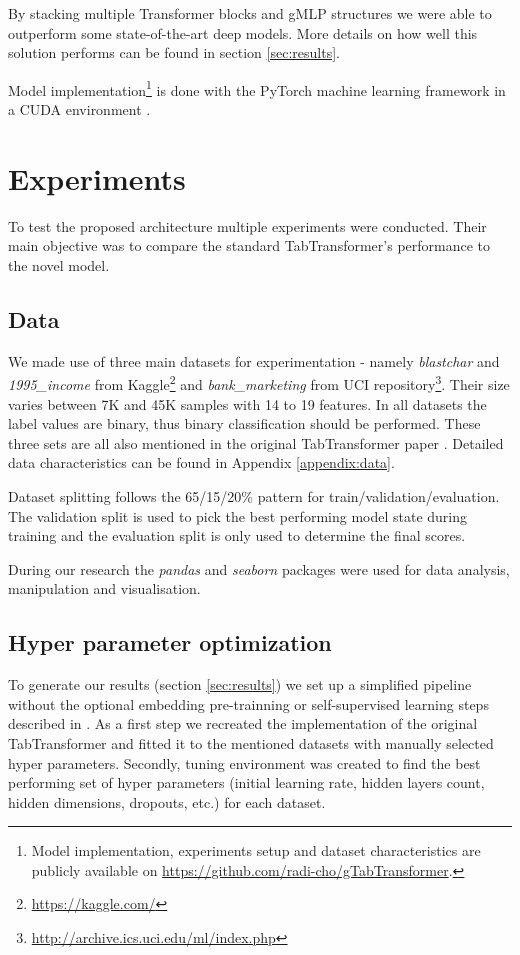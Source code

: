\documentclass{article}
\newcommand{\projectSource}{\url{https://github.com/radi-cho/gTabTransformer}}
\begin{document}
By stacking multiple Transformer blocks and gMLP structures we were able to outperform some state-of-the-art deep models. More details on how well this solution performs can be found in section \ref{sec:results}.

Model implementation\footnote{Model implementation, experiments setup and dataset characteristics are publicly available on \projectSource.} is done with the PyTorch \cite{NEURIPS2019_9015} machine learning framework in a CUDA environment \cite{cuda}.

\section{Experiments}

To test the proposed architecture multiple experiments were conducted. Their main objective was to compare the standard TabTransformer's performance to the novel model.

\subsection{Data}

We made use of three main datasets for experimentation - namely \textit{blastchar} and \textit{1995\_income} from Kaggle\footnote{\url{https://kaggle.com/}} and \textit{bank\_marketing} from UCI repository\footnote{\url{http://archive.ics.uci.edu/ml/index.php}}. Their size varies between 7K and 45K samples with 14 to 19 features. In all datasets the label values are binary, thus binary classification should be performed. These three sets are all also mentioned in the original TabTransformer paper \cite{Huang2020TabTransformerTD}. Detailed data characteristics can be found in Appendix \ref{appendix:data}.

Dataset splitting follows the 65/15/20\% pattern for train/validation/evaluation. The validation split is used to pick the best performing model state during training and the evaluation split is only used to determine the final scores.

During our research the \textit{pandas} \cite{mckinney-proc-scipy-2010} and \textit{seaborn} \cite{Waskom2021} packages were used for data analysis, manipulation and visualisation.

\subsection{Hyper parameter optimization}

To generate our results (section \ref{sec:results}) we set up a simplified pipeline without the optional embedding pre-trainning or self-supervised learning steps described in \cite{Huang2020TabTransformerTD}. As a first step we recreated the implementation of the original TabTransformer and fitted it to the mentioned datasets with manually selected hyper parameters. Secondly, tuning environment was created to find the best performing set of hyper parameters (initial learning rate, hidden layers count, hidden dimensions, dropouts, etc.) for each dataset.
\end{document}

